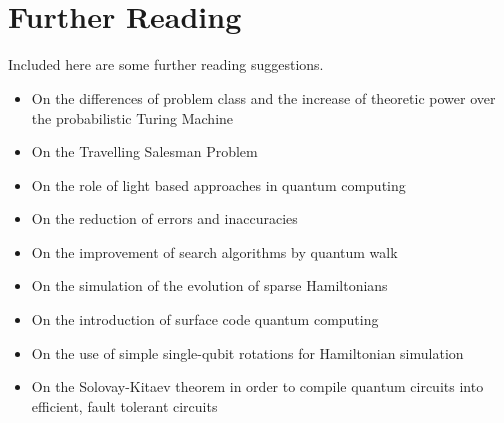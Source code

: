 \documentclass[reqno]{amsart}
\numberwithin{equation}{section}
\numberwithin{figure}{section}
\begin{document}
\section{\\Further Reading}
Included here are some further reading suggestions.
\begin{itemize}
    \item On the differences of problem class and the increase of theoretic power over the probabilistic Turing Machine \cite{Simon1997}
    \item On the Travelling Salesman Problem \cite{Goldsmith2024}
    \item On the role of light based approaches in quantum computing \cite{Walmsley2023}
    \item On the reduction of errors and inaccuracies \cite{Aharonov1999}
    \item On the improvement of search algorithms by quantum walk \cite{Magniez2011}
    \item On the simulation of the evolution of sparse Hamiltonians \cite{Berry2006}
    \item On the introduction of surface code quantum computing \cite{Fowler2012}
    \item On the use of simple single-qubit rotations for Hamiltonian simulation \cite{Low2017}
    \item On the Solovay-Kitaev theorem in order to compile quantum circuits into efficient, fault tolerant circuits \cite{Dawson2005}
\end{itemize}


\end{document}
